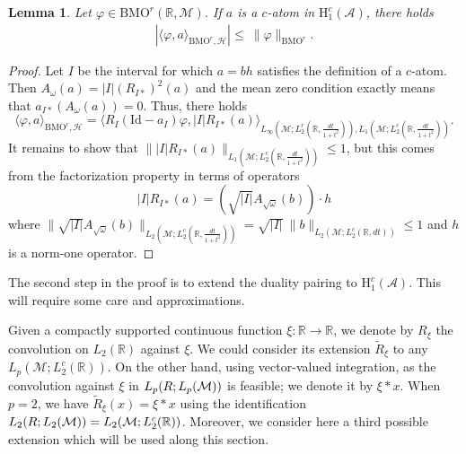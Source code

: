 \documentclass[psamsfonts]{amsart}
\newtheorem{lemma}[theorem]{Lemma}
\newcommand{\R}{\mathbb{R}}
\newcommand{\la}{\langle}
\newcommand{\ra}{\rangle}
\newcommand{\Lp}{L_p}
\newcommand{\Lone}{L_1}
\newcommand{\Linfty}{L_\infty}
\newcommand{\Ltwo}{L_2}
\newcommand{\Ltwoc}{L_2^c}
\newcommand{\Ltwor}{L_2^r}
\newcommand{\Honec}{\mathrm{H}_1^c}
\newcommand{\BMOr}{\mathrm{BMO}^r}
\newcommand{\Hardyc}{\Honec(\mathcal{A})}
\newcommand{\id}{\mathrm{Id}}
\begin{document}
    \begin{lemma}\label{lem:functionalonAtoms}
        Let $\varphi \in \BMOr(\mathbb{R},\mathcal{M})$. If $a$ is a $c$-atom in $\Hardyc$, there holds
        \begin{align*}
            |\langle \varphi, a \rangle_{\BMOr,\mathcal H}| \leq \ \|\varphi\|_{\BMOr}.
        \end{align*}
    \end{lemma}
    \begin{proof}
      Let $I$ be the interval for which $a=bh$ satisfies the
      definition of a $c$-atom. Then $A_\omega(a)=|I|(R_{I*})^{2}(a)$ and
      the mean zero condition exactly means that $a_{I*}(A_\omega(a))=0$. Thus, there holds
      $$\langle \varphi, a \rangle_{\BMOr,\mathcal H}=\la R_I(\id-a_I)\varphi, |I| R_{I*}(a)\ra_{\Linfty(\mathcal{M};\Ltwor(\mathbb{R},\frac{dt}{1+t^2})),
        \Lone(\mathcal{M};\Ltwoc(\mathbb{R},\frac{dt}{1+t^2}))}.$$
      It remains to show that $\||I|R_{I*}(a)\|_{\Lone(\mathcal{M};\Ltwoc(\mathbb{R},\frac{dt}{1+t^2}))}\leq 1$, but this comes from the factorization property in terms of operators
      $$|I|R_{I*}(a)= (\sqrt{|I|} A_{\sqrt\omega}(b)) \cdot h$$ 
      where $\|\sqrt{|I|} A_{\sqrt\omega}(b)\|_{\Ltwo(\mathcal{M};\Ltwoc(\mathbb{R},\frac{dt}{1+t^2}))}
      =\sqrt{|I|} \ \| b\|_{\Ltwo(\mathcal{M};\Ltwoc(\mathbb{R},{dt}))}\leq 1$
      and $h$ is a norm-one operator.           
    \end{proof}

The second step in the proof is to extend the duality pairing to $\Hardyc$. This will require some care and approximations.


Given  a compactly supported continuous function $\xi:\mathbb R\to \R$, 
we denote by $R_\xi$ the convolution on
$\Ltwo(\mathbb R)$ against $\xi$. We could consider its
extension $\widetilde R_\xi$ to any $\Lp(\mathcal M;\Ltwoc(\mathbb
R))$. On the other hand, using vector-valued integration, as the convolution against $\xi$ in $\Lp(\mathbb \R; \Lp(\mathcal M))$ is feasible; we denote it by  $\xi*x$. When $p=2$, we have $\widetilde R_\xi(x)=\xi*x$ using the identification  $\Ltwo(\mathbb \R; \Ltwo(\mathcal M))=\Ltwo(\mathcal M;\Ltwoc(\mathbb R))$. Moreover, we consider here a third possible extension which will be used along this section.
\end{document}
